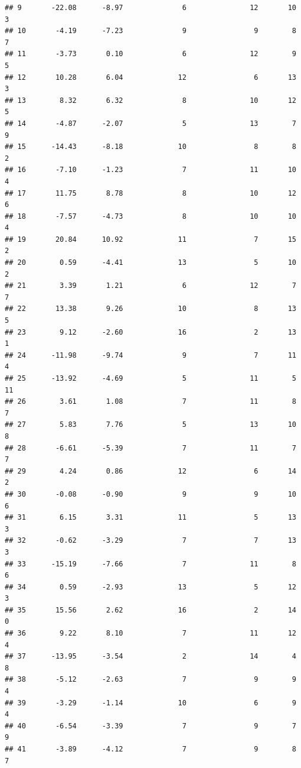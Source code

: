 \documentclass[]{book}
\begin{document}
\begin{verbatim}
## 9       -22.08      -8.97              6               12       10          3
## 10       -4.19      -7.23              9                9        8          7
## 11       -3.73       0.10              6               12        9          5
## 12       10.28       6.04             12                6       13          3
## 13        8.32       6.32              8               10       12          5
## 14       -4.87      -2.07              5               13        7          9
## 15      -14.43      -8.18             10                8        8          2
## 16       -7.10      -1.23              7               11       10          4
## 17       11.75       8.78              8               10       12          6
## 18       -7.57      -4.73              8               10       10          4
## 19       20.84      10.92             11                7       15          2
## 20        0.59      -4.41             13                5       10          2
## 21        3.39       1.21              6               12        7          7
## 22       13.38       9.26             10                8       13          5
## 23        9.12      -2.60             16                2       13          1
## 24      -11.98      -9.74              9                7       11          4
## 25      -13.92      -4.69              5               11        5         11
## 26        3.61       1.08              7               11        8          7
## 27        5.83       7.76              5               13       10          8
## 28       -6.61      -5.39              7               11        7          7
## 29        4.24       0.86             12                6       14          2
## 30       -0.08      -0.90              9                9       10          6
## 31        6.15       3.31             11                5       13          3
## 32       -0.62      -3.29              7                7       13          3
## 33      -15.19      -7.66              7               11        8          6
## 34        0.59      -2.93             13                5       12          3
## 35       15.56       2.62             16                2       14          0
## 36        9.22       8.10              7               11       12          4
## 37      -13.95      -3.54              2               14        4          8
## 38       -5.12      -2.63              7                9        9          4
## 39       -3.29      -1.14             10                6        9          4
## 40       -6.54      -3.39              7                9        7          9
## 41       -3.89      -4.12              7                9        8          7

\end{verbatim}
\end{document}
